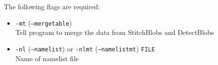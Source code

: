 \documentclass{article}
\begin{document}
The following flags are required:
\begin{itemize}
\item[] \texttt{-mt} (\texttt{--mergetable}) \\ Tell program to merge the data from StitchBlobs and DetectBlobs
\item[]\texttt{-nl} (\texttt{--namelist}) or \texttt{-nlmt} (\texttt{--namelistmt}) \texttt{FILE}\\ Name of namelist file
\end{itemize}

%
%
%
\end{document}
